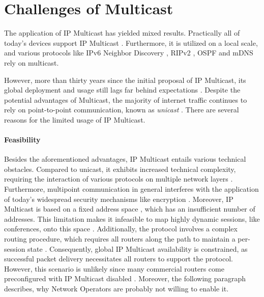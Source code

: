 \section{Challenges of Multicast} %
\label{sec:Challenges of Multicast}


The application of IP Multicast has yielded mixed results.
Practically all of today's devices support IP Multicast
    \cite{ratnasamy2006revisiting}.
Furthermore, it is utilized on a local scale, and various protocols like IPv6
    Neighbor Discovery \cite{rfc4861_ipv6_nd}, RIPv2 \cite{rfc2453_rip}, OSPF
    \cite{rfc2328_ospf} and mDNS \cite{rfc6762_mdns} rely on multicast.

However, more than thirty years since the initial proposal of IP Multicast, its
    global deployment and usage still lags far behind expectations
    \cite{diot2000deployment, ratnasamy2006revisiting}.
Despite the potential advantages of Multicast, the majority of internet traffic
    continues to rely on point-to-point communication, known as
    \textit{unicast} \cite{universal_mc}.
There are several reasons for the limited usage of IP Multicast.

\paragraph{Feasibility} %
\label{par:Feasibility}
Besides the aforementioned advantages, IP Multicast entails various technical
    obstacles.
Compared to unicast, it exhibits increased technical complexity, requiring
    the interaction of various protocols on multiple network layers
    \cite{ratnasamy2006revisiting,diot2000deployment}.
Furthermore, multipoint communication in general interferes with the
    application of today's widespread security mechanisms like encryption
    \cite{rafaeli2003group_key_mgm}.
Moreover, IP Multicast is based on a fixed address space \cite{rfc1112_ip4mc,
    rfc4291_ip6mc}, which has an insufficient number of addresses.
This limitation makes it infeasible to map highly dynamic sessions, like
    conferences, onto this space \cite{meadcast2}.
Additionally, the protocol involves a complex routing procedure, which requires
    all routers along the path to maintain a per-session state
    \cite{diot2000deployment, ratnasamy2006revisiting}.
Consequently, global IP Multicast availability is constrained, as successful
    packet delivery necessitates all routers to support the protocol.
However, this scenario is unlikely since many commercial routers come
    preconfigured with IP Multicast disabled \cite{aruba_doc}.
Moreover, the following paragraph describes, why Network Operators are probably
    not willing to enable it.

